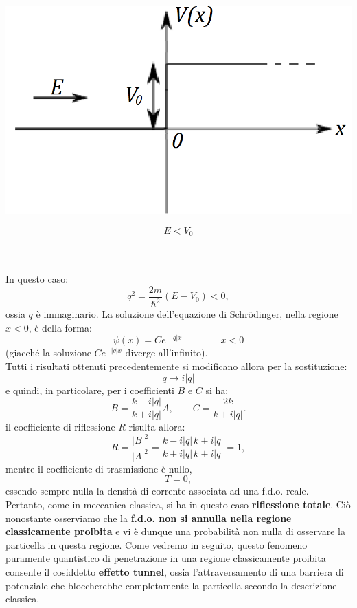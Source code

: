 \documentclass[a4paper,11pt,oneside]{book}
\begin{document}
\begin{minipage}{.7\textwidth}
\includegraphics[width=.9\textwidth]{immagini/cap_10/fig_10_7.png}
\end{minipage}
\hspace{.5cm}
\begin{minipage}{.1\textwidth}
\[E<V_0\]
\end{minipage}\\ \\

In questo caso:
\begin{equation}
q^2=\frac{2m}{\hbar ^2}\left( E- V_0 \right)<0,
\end{equation}
ossia $q$ è immaginario. La soluzione dell'equazione di Schr\"{o}dinger, nella regione $x<0$, è della forma:
\begin{equation}
\psi (x) = Ce^{-|q|x} \qquad \qquad x<0
\end{equation}
(giacché la soluzione $\displaystyle{Ce^{+|q|x}}$ diverge all'infinito).\\
Tutti i risultati ottenuti precedentemente si modificano allora per la sostituzione:
\begin{equation}
q \rightarrow i|q|
\end{equation}
e quindi, in particolare, per i coefficienti $B$ e $C$ si ha:
\begin{equation}
B=\frac{k-i|q|}{k+i|q|}A, \qquad C=\frac{2k}{k+i|q|}.
\end{equation}
il coefficiente di riflessione $R$ risulta allora:
\begin{equation}
R=\frac{|B|^2}{|A|^2}=\frac{k-i|q|}{k+i|q|}\frac{k+i|q|}{k+i|q|}=1,
\end{equation}
mentre il coefficiente di trasmissione è nullo,
\begin{equation}
T=0,
\end{equation}
essendo sempre nulla la densità di corrente associata ad una f.d.o. reale.\\
Pertanto, come in meccanica classica, si ha in questo caso \textbf{riflessione totale}. Ciò nonostante osserviamo che la \textbf{f.d.o. non si annulla nella regione classicamente proibita} e vi è dunque una probabilità non nulla di osservare la particella in questa regione. Come vedremo in seguito, questo fenomeno puramente quantistico di penetrazione in una regione classicamente proibita consente il cosiddetto \textbf{effetto tunnel}, ossia l'attraversamento di una barriera di potenziale che bloccherebbe completamente la particella secondo la descrizione classica.
\end{document}
